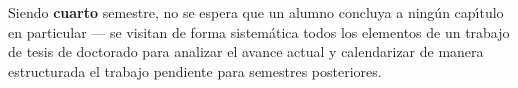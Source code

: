 \documentclass[10 pt]{article}
\begin{document}


Siendo {\bf cuarto} semestre, no se espera que un alumno concluya a
ning\'{u}n cap\'{\i}tulo en particular --- se visitan de forma
sistem\'{a}tica todos los elementos de un trabajo de tesis de
doctorado para analizar el avance actual y calendarizar de manera
estructurada el trabajo pendiente para semestres posteriores.


\end{document}
